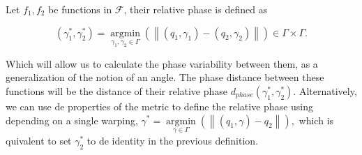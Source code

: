Let $f_1, f_2$ be functions in $\mathcal{F}$, their relative phase is defined as

$$
\left(\gamma_{1}^{*}, \gamma_{2}^{*}\right)=\underset{\gamma_{1}, \gamma_{2} \in \Gamma}{\operatorname{argmin}}\left(\left\|\left(q_{1}, \gamma_{1}\right)-\left(q_{2}, \gamma_{2}\right)\right\|\right) \in \Gamma \times \Gamma.
$$

Which will allow us to calculate the phase variability between them,
as a generalization of the notion of an angle. The phase distance between these
functions will be the distance of their relative phase
$d_{phase} (\gamma_{1}^{*}, \gamma_{2}^{*})$. Alternatively, we can use de properties of
the metric to define the relative phase using depending on a single warping,
$
\gamma^{*}=\underset{\gamma \in \Gamma}{\operatorname{argmin}}\left(\left\|\left(q_{1}, \gamma \right)- q_{2}\right\|\right),
$
which is quivalent to set $\gamma_2^*$ to de identity in the previous definition.
